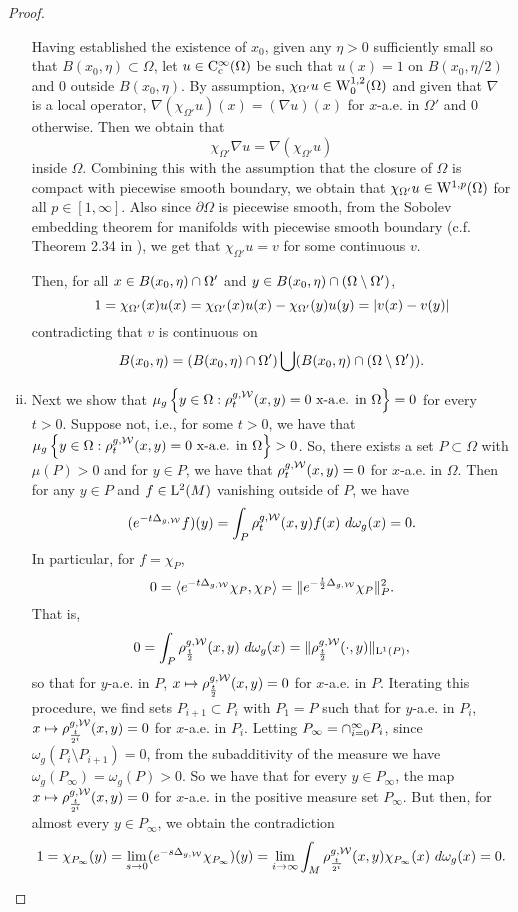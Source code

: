 \documentclass[a4paper, 12pt]{amsart}
\begin{document}
\begin{proof}
\begin{enumerate}[(i)]
	Having established the existence of $x_0$, given any $\eta > 0$ sufficiently small so that $B(x_0,\eta) \subset \Omega$, let $u \in \Ck[c]{\infty}(\Omega)$ be such that $u(x) = 1$ on $B(x_0, \eta/2)$ and $0$ outside $B(x_0,\eta)$. By assumption, $\chi_{\Omega'} u \in \SobH[0]{1}(\Omega)$ and  given that $\nabla$ is a local operator, $\nabla (\chi_{\Omega'} u)(x) = (\nabla u)(x)$ for $x$-a.e. in $\Omega'$ and $0$ otherwise. Then we obtain that
	$$\chi_{\Omega'}\nabla u = \nabla(\chi_{\Omega'} u)$$
	inside $\Omega$.
	Combining this with the assumption that the  closure of $\Omega$ is compact with piecewise smooth boundary, we obtain that $\chi_{\Omega'} u \in \Sob{1,p}(\Omega)$ for all $p \in [1,\infty]$. 
	Also since $\partial \Omega$ is piecewise smooth, from the Sobolev embedding theorem for manifolds with piecewise smooth boundary (c.f. Theorem 2.34 in \cite{Aubin}), we get that $\chi_{\Omega'} u = v$ for some continuous $v$.

	
	Then, for all $x \in B(x_0,\eta) \intersect \Omega'$ and $y \in B(x_0,\eta) \intersect (\Omega \setminus \Omega')$, 
	$$1 = \chi_{\Omega'}(x)u(x) = \chi_{\Omega'}(x) u(x) - \chi_{\Omega'}(y)u(y) = \modulus{v(x) - v(y)}$$ 
	contradicting that $v$ is continuous on
        $$B(x_0, \eta) = (B(x_0,\eta) \intersect \Omega') \bigcup (B(x_0,\eta) \intersect (\Omega \setminus \Omega')).$$


\item Next we show that $\mu_g\set{y \in \Omega: \hk^{g,\cW}_{t}(x,y) = 0\ \text{x-a.e. in}\ \Omega} = 0$ for every $t>0$. 
	Suppose not, i.e., for some $t > 0$, we have that $\mu_g\set{y \in \Omega: \hk^{g,\cW}_{t}(x,y) = 0\ \text{x-a.e. in}\ \Omega} > 0$.
	So, there exists a set $P \subset \Omega$ with $\mu(P) > 0$ and for $y \in P$, we have that $\hk^{g,\cW}_t(x,y) = 0$ for $x$-a.e. in $\Omega$.
	Then for any $y \in P$ and $f \in \Lp{2}(M)$ vanishing outside of $P$, we have
	$$ (e^{-t\Delta_{g,\cW}} f)(y) = \int_{P} \hk_t^{g,\cW}(x,y) f(x)\ d\omega_g(x) = 0.$$
	In particular, for $f = \chi_{P}$,
	$$ 0 = \inprod{e^{-t\Delta_{g,\cW}} \chi_{P}, \chi_{P}} = \norm{  e^{-\frac{t}{2}\Delta_{g,\cW}} \chi_{P}}_{P}^2.$$ 
	That is,
	$$ 0 = \int_{P} \hk^{g,\cW}_{\frac{t}{2}}(x,y)\ d\omega_g(x) = \norm{\hk^{g,\cW}_{\frac{t}{2}}(\cdot,y)}_{\Lp{1}(P)},$$
	so that for $y$-a.e. in $P$, $x \mapsto \hk^{g,\cW}_{\frac{t}{2}}(x,y) = 0$ for $x$-a.e. in $P$.	
	Iterating this procedure, we find sets $P_{i+1} \subset P_i$ with $P_1 = P$ such that for $y$-a.e. in $P_i$, $x \mapsto \hk^{g,\cW}_{\frac{t}{2^i}}(x,y) = 0$ for $x$-a.e. in $P_i$.
	Letting $P_\infty = \intersect_{i=0}^\infty P_i$, since $\omega_g(P_i \setminus P_{i+1}) = 0$, from the subadditivity of the measure we have $\omega_g(P_\infty) = \omega_g(P) > 0$. So we have that for every $y \in P_\infty$,
	the map $x \mapsto \hk^{g,\cW}_{\frac{t}{2^i}}(x,y) = 0$ for $x$-a.e. in the positive measure set $P_\infty$.
	But then, for almost every $y \in P_\infty$, we obtain the contradiction
	$$1 = \chi_{P_\infty}(y) = \lim_{s \to 0} (e^{-s \Delta_{g,\cW}}\chi_{P_\infty})(y) = \lim_{i \to \infty} \int_{M} \hk^{g,\cW}_{\frac{t}{2^i}}(x,y) \chi_{P_\infty}(x)\ d\omega_g(x) = 0.$$


\end{enumerate}
\end{proof}
\end{document}
